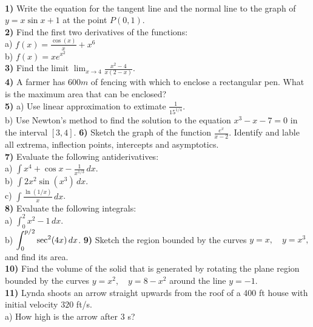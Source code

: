 \documentclass[12pt]{article}
\begin{document}
\\ %
{\bf 1)} Write the equation for the tangent line and the
normal line to the graph of $\displaystyle{y = x\sin x + 1}$
at the point $P(0,1)$.
\\ %
{\bf 2)} Find the first two derivatives of the functions:
\\ %
a) $ \displaystyle{f(x) = \frac{\cos (x)}{x} + x^6}$
\\ %
b) $\displaystyle{f(x) = xe^{x^2}}$
\\ %
{\bf 3)}  Find the limit $\displaystyle{
\lim_{x\to 4}\frac{x^2-4}{x(2-x)}}$.
\\ %
{\bf 4)} A farmer has $600 m$ of fencing with which to
enclose a rectangular pen. What is the
maximum area that can be enclosed?
\\ %
{\bf 5)} a) Use linear approximation to extimate
$\displaystyle{\frac{1}{15^{1/4}}}$.
\\ %
b) Use Newton's method to find the solution
to the equation $\displaystyle{x^3-x-7= 0}$ in
the interval $\displaystyle{[3,4]}$.
{\bf 6)} Sketch the graph of the function 
$\displaystyle{\frac{e^x}{x-2}}$. Identify and lable all
extrema, inflection points, intercepts and asymptotics.
\\ %
{\bf 7)} Evaluate the following antiderivatives:
\\ %
a) 
$\displaystyle{\int x^4 + \cos x - \frac{1}{x^{1/3}}\, dx}$.
\\ %
b) $\displaystyle{\int 2x^2\sin (x^3)\, dx}$.
\\ %
c) $\displaystyle{\int \frac{\ln (1/x)}{x}\, dx}$.
\\ %
{\bf 8)} Evaluate the following integrals:
\\ %
a)  $\displaystyle{\int_0^2 x^2 - 1\, dx}$.
\\ %
b)  $\displaystyle{\int_0^{p /2} {\rm sec}^2(4x)\, dx}$.
{\bf 9)} Sketch the region bounded by the curves
$\displaystyle{y=x,\quad y= x^3,}$
and find its area.
\\ %
{\bf 10)} Find the volume of the solid that is generated
by rotating the plane region bounded
by the curves  $\displaystyle{y= x^2,\quad
y = 8 - x^2}$ around the line $y=-1$.
\\ %
{\bf 11)} Lynda shoots an arrow straight upwards from the
roof of a 400 ft house with initial velocity $320$ ft/s.
\\ %
a) How high is the arrow after $3$ s?
\end{document}
